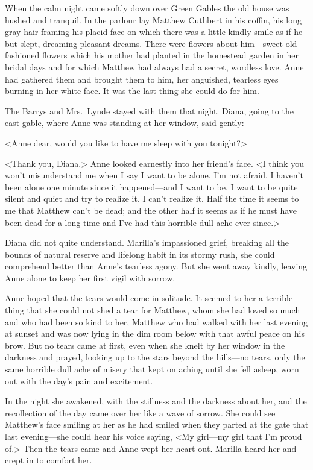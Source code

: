 When the calm night came softly down over Green Gables the old house was hushed and tranquil. In the parlour lay Matthew Cuthbert in his coffin, his long gray hair framing his placid face on which there was a little kindly smile as if he but slept, dreaming pleasant dreams. There were flowers about him—sweet old-fashioned flowers which his mother had planted in the homestead garden in her bridal days and for which Matthew had always had a secret, wordless love. Anne had gathered them and brought them to him, her anguished, tearless eyes burning in her white face. It was the last thing she could do for him.

The Barrys and Mrs.~Lynde stayed with them that night. Diana, going to the east gable, where Anne was standing at her window, said gently:

<Anne dear, would you like to have me sleep with you tonight?>

<Thank you, Diana.> Anne looked earnestly into her friend's face. <I think you won't misunderstand me when I say I want to be alone. I'm not afraid. I haven't been alone one minute since it happened—and I want to be. I want to be quite silent and quiet and try to realize it. I can't realize it. Half the time it seems to me that Matthew can't be dead; and the other half it seems as if he must have been dead for a long time and I've had this horrible dull ache ever since.>

Diana did not quite understand. Marilla's impassioned grief, breaking all the bounds of natural reserve and lifelong habit in its stormy rush, she could comprehend better than Anne's tearless agony. But she went away kindly, leaving Anne alone to keep her first vigil with sorrow.

Anne hoped that the tears would come in solitude. It seemed to her a terrible thing that she could not shed a tear for Matthew, whom she had loved so much and who had been so kind to her, Matthew who had walked with her last evening at sunset and was now lying in the dim room below with that awful peace on his brow. But no tears came at first, even when she knelt by her window in the darkness and prayed, looking up to the stars beyond the hills—no tears, only the same horrible dull ache of misery that kept on aching until she fell asleep, worn out with the day's pain and excitement.

In the night she awakened, with the stillness and the darkness about her, and the recollection of the day came over her like a wave of sorrow. She could see Matthew's face smiling at her as he had smiled when they parted at the gate that last evening—she could hear his voice saying, <My girl—my girl that I'm proud of.> Then the tears came and Anne wept her heart out. Marilla heard her and crept in to comfort her.

